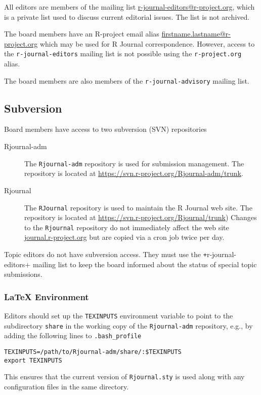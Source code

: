 \documentclass[11pt]{article}
\begin{document}
All editors are members of the mailing list
\url{r-journal-editors@r-project.org}, which is a private list used to
discuss current editorial issues. The list is not archived.
 
The board members have an R-project email alias
\url{firstname.lastname@r-project.org} which may be used for R Journal
correspondence.  However, access to the \verb+r-journal-editors+ mailing list
is not possible using the \verb+r-project.org+ alias.

The board members are also members of the \verb+r-journal-advisory+
mailing list.

\subsection{Subversion}

Board members have access to two subversion (SVN) repositories
\begin{description}
\item[Rjournal-adm] The \texttt{Rjournal-adm} repository is used for
  submission management. The repository is located at
  \url{https://svn.r-project.org/Rjournal-adm/trunk}.
\item[Rjournal] The \texttt{RJournal} repository is used to maintain
  the R Journal web site. The repository is located at
  \url{https://svn.r-project.org/Rjournal/trunk}) Changes to the
  \texttt{Rjournal} repository do not immediately affect the web site
  \url{journal.r-project.org} but are copied via a cron job twice per
  day.
\end{description}
Topic editors do not have subversion access. They must use the
\texttt+r-journal-editors+ mailing list to keep the board informed
about the status of special topic submissions.

\subsubsection{LaTeX Environment}

Editors should set up the \texttt{TEXINPUTS} environment variable to
point to the subdirectory \texttt{share} in the working copy of the
\texttt{Rjournal-adm} repository, e.g., by adding the following lines to
\verb+.bash_profile+

\begin{verbatim}
TEXINPUTS=/path/to/Rjournal-adm/share/:$TEXINPUTS
export TEXINPUTS
\end{verbatim}

This ensures that the current version of \texttt{Rjournal.sty} is used
along with any configuration files in the same directory.
\end{document}
